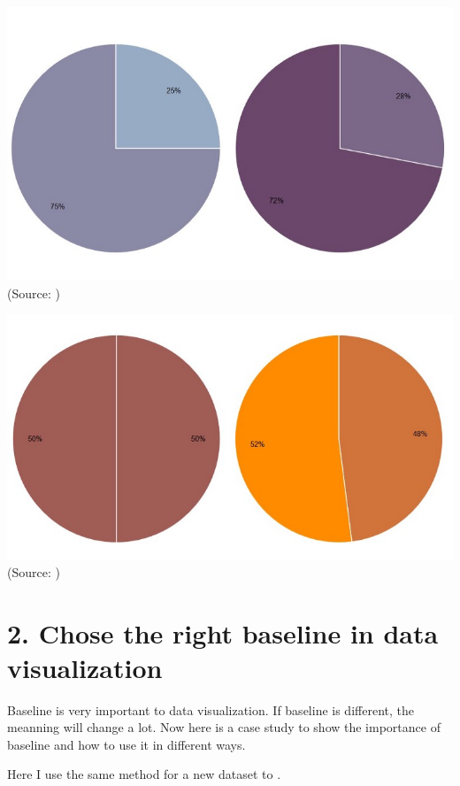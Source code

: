 \documentclass[]{book}
\theoremstyle{definition}
\theoremstyle{definition}
\theoremstyle{definition}
\theoremstyle{remark}
\begin{document}
\includegraphics{images/henry-quarter.png} (Source:
\citep{henry-defense-pie})

\includegraphics{images/henry-half.png} (Source:
\citep{henry-defense-pie})

\section{2. Chose the right baseline in data
visualization}\label{chose-the-right-baseline-in-data-visualization}

Baseline is very important to data visualization. If baseline is
different, the meanning will change a lot. Now here is a case study to
show the importance of baseline and how to use it in different ways.

Here I use the same method for a new dataset to .
\end{document}
